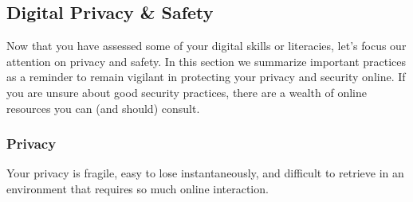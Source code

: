 \documentclass[
]{book}
\theoremstyle{definition}
\theoremstyle{definition}
\theoremstyle{definition}
\theoremstyle{definition}
\theoremstyle{remark}
\begin{document}
\hypertarget{digital-privacy-safety}{%
\subsection{Digital Privacy \& Safety}\label{digital-privacy-safety}}

Now that you have assessed some of your digital skills or literacies, let's focus our attention on privacy and safety. In this section we summarize important practices as a reminder to remain vigilant in protecting your privacy and security online. If you are unsure about good security practices, there are a wealth of online resources you can (and should) consult.

\hypertarget{privacy}{%
\subsubsection*{Privacy}\label{privacy}}

Your privacy is fragile, easy to lose instantaneously, and difficult to retrieve in an environment that requires so much online interaction.
\end{document}

